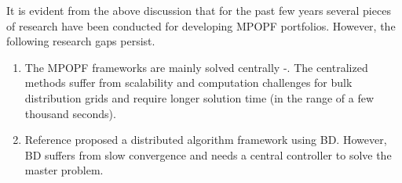 \documentclass{article}
\begin{document}
It is evident from the above discussion that for the past few years several pieces of research have been conducted for developing MPOPF portfolios. However, the following research gaps persist.
\begin{enumerate}
    \item The MPOPF frameworks are mainly solved centrally \cite{Gabash}-\cite{Zhang1}. The centralized methods suffer from scalability and computation challenges for bulk distribution grids and require longer solution time (in the range of a few thousand seconds).
    \item Reference \cite{Wu} proposed a distributed algorithm framework using BD. However, BD suffers from slow convergence and needs a central controller to solve the master problem. 
\end{enumerate}
\end{document}

